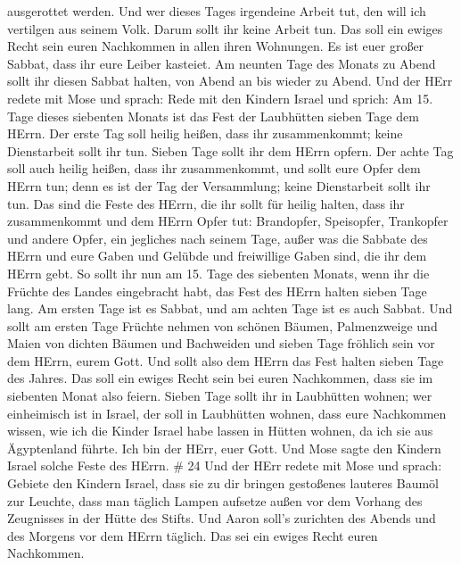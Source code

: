 ausgerottet werden.  Und wer dieses Tages irgendeine Arbeit
tut, den will ich vertilgen aus seinem Volk.  Darum sollt
ihr keine Arbeit tun. Das soll ein ewiges Recht sein euren Nachkommen in
allen ihren Wohnungen.  Es ist euer großer Sabbat, dass ihr
eure Leiber kasteiet. Am neunten Tage des Monats zu Abend sollt ihr
diesen Sabbat halten, von Abend an bis wieder zu Abend. 
Und der HErr redete mit Mose und sprach:  Rede mit den
Kindern Israel und sprich: Am 15. Tage dieses siebenten Monats ist das
Fest der Laubhütten sieben Tage dem HErrn.  Der erste Tag
soll heilig heißen, dass ihr zusammenkommt; keine Dienstarbeit sollt ihr
tun.  Sieben Tage sollt ihr dem HErrn opfern. Der achte Tag
soll auch heilig heißen, dass ihr zusammenkommt, und sollt eure Opfer
dem HErrn tun; denn es ist der Tag der Versammlung; keine Dienstarbeit
sollt ihr tun.  Das sind die Feste des HErrn, die ihr sollt
für heilig halten, dass ihr zusammenkommt und dem HErrn Opfer tut:
Brandopfer, Speisopfer, Trankopfer und andere Opfer, ein jegliches nach
seinem Tage,  außer was die Sabbate des HErrn und eure
Gaben und Gelübde und freiwillige Gaben sind, die ihr dem HErrn gebt.
 So sollt ihr nun am 15. Tage des siebenten Monats, wenn
ihr die Früchte des Landes eingebracht habt, das Fest des HErrn halten
sieben Tage lang. Am ersten Tage ist es Sabbat, und am achten Tage ist
es auch Sabbat.  Und sollt am ersten Tage Früchte nehmen
von schönen Bäumen, Palmenzweige und Maien von dichten Bäumen und
Bachweiden und sieben Tage fröhlich sein vor dem HErrn, eurem Gott.
 Und sollt also dem HErrn das Fest halten sieben Tage des
Jahres. Das soll ein ewiges Recht sein bei euren Nachkommen, dass sie im
siebenten Monat also feiern.  Sieben Tage sollt ihr in
Laubhütten wohnen; wer einheimisch ist in Israel, der soll in Laubhütten
wohnen,  dass eure Nachkommen wissen, wie ich die Kinder
Israel habe lassen in Hütten wohnen, da ich sie aus Ägyptenland führte.
Ich bin der HErr, euer Gott.  Und Mose sagte den Kindern
Israel solche Feste des HErrn. \# 24  Und der HErr redete
mit Mose und sprach:  Gebiete den Kindern Israel, dass sie
zu dir bringen gestoßenes lauteres Baumöl zur Leuchte, dass man täglich
Lampen aufsetze  außen vor dem Vorhang des Zeugnisses in der
Hütte des Stifts. Und Aaron soll's zurichten des Abends und des Morgens
vor dem HErrn täglich. Das sei ein ewiges Recht euren Nachkommen.

